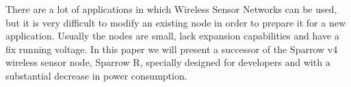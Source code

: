 There are a lot of applications in which Wireless Sensor Networks can be used, but it is very
difficult to modify an existing node in order to prepare it for a new application. Usually the
nodes are small, lack expansion capabilities and have a fix running voltage. In this paper we will
present a successor of the Sparrow v4 wireless sensor node, Sparrow R, specially designed for developers and with a substantial decrease in power consumption.
